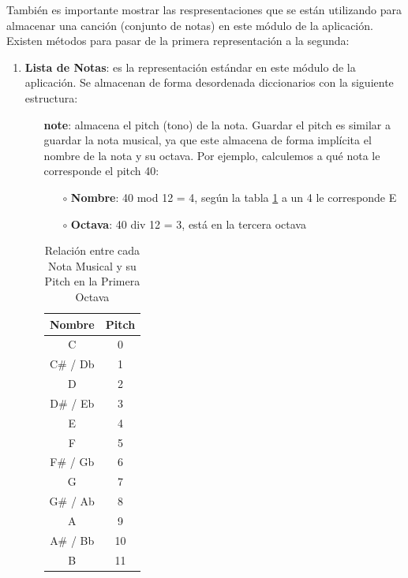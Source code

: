     También es importante mostrar las respresentaciones que se están utilizando para almacenar una canción (conjunto de notas) en este módulo de la aplicación. Existen métodos para pasar de la primera representación a la segunda:

    \begin{enumerate}
        \item \textbf{Lista de Notas}: es la representación estándar en este módulo de la aplicación. Se almacenan de forma desordenada diccionarios con la siguiente estructura:
        \begin{enumerate}
            \item[\textbullet] \textbf{note}: almacena el pitch (tono) de la nota. Guardar el pitch es similar a guardar la nota musical, ya que este almacena de forma implícita el nombre de la nota y su octava. Por ejemplo, calculemos a qué nota le corresponde el pitch 40:
            \begin{enumerate}
                    \item[\(\circ\)] \textbf{Nombre}: 40 mod 12 = 4, según la tabla \ref{tab:nota_pitch} a un 4 le corresponde E
                    \item[\(\circ\)] \textbf{Octava}: 40 div 12 = 3, está en la tercera octava
            \end{enumerate}
                       
\begin{table}[htbp]
    \centering
    \begin{tabular}{c|c}
        \textbf{Nombre} & \textbf{Pitch} \\
        \hline
        C & 0 \\
        C\# / Db & 1 \\
        D & 2 \\
        D\# / Eb & 3 \\
        E & 4 \\
        F & 5 \\
        F\# / Gb & 6 \\
        G & 7 \\
        G\# / Ab & 8 \\
        A & 9 \\
        A\# / Bb & 10 \\
        B & 11 \\
    \end{tabular}
    \caption{Relación entre cada Nota Musical y su Pitch en la Primera Octava}
\label{tab:nota_pitch}
\end{table}


\end{enumerate}
\end{enumerate}
